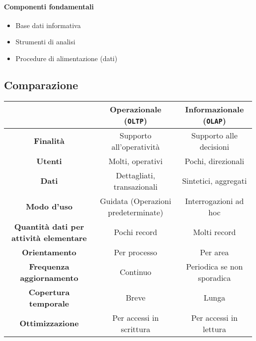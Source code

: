         \paragraph{Componenti fondamentali}
            \begin{itemize}
                \item Base dati informativa
                \item Strumenti di analisi
                \item Procedure di alimentazione (dati)
            \end{itemize}
    \subsection{Comparazione}
        \begin{table}[H]
            \begin{adjustbox}{width=\textwidth}
                \begin{tabular}{|c|c|c|}
                    \hline
                    & \textbf{Operazionale} (\texttt{OLTP}) & \textbf{Informazionale} (\texttt{OLAP}) \\
                    \hline
                    \textbf{Finalità} & Supporto all'operatività & Supporto alle decisioni \\
                    \hline
                    \textbf{Utenti} & Molti, operativi & Pochi, direzionali \\
                    \hline
                    \textbf{Dati} & Dettagliati, transazionali & Sintetici, aggregati \\
                    \hline
                    \textbf{Modo d'uso} & Guidata (Operazioni predeterminate) & Interrogazioni ad hoc \\
                    \hline
                    \textbf{Quantità dati per attività elementare} & Pochi record & Molti record \\
                    \hline
                    \textbf{Orientamento} & Per processo & Per area \\
                    \hline
                    \textbf{Frequenza aggiornamento} & Continuo & Periodica se non sporadica \\
                    \hline
                    \textbf{Copertura temporale} & Breve & Lunga \\
                    \hline
                    \textbf{Ottimizzazione} & Per accessi in scrittura & Per accessi in lettura \\
                    \hline
                \end{tabular}
            \end{adjustbox}
        \end{table}